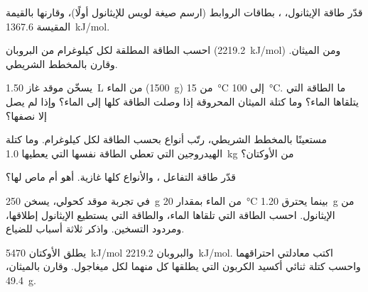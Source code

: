 \begin{exercise}[$\star\star$]\label{exo:g11:reaction-energy:7}
قدّر طاقة  الإيثانول، ، بطاقات الروابط (ارسم صيغة لويس للإيثانول
أولًا)، وقارنها بالقيمة المقيسة \qty{1367.6}{kJ/mol}.
\end{exercise}

\begin{exercise}[$\star\star$]\label{exo:g11:reaction-energy:8}
احسب الطاقة المطلقة لكل كيلوغرام من البروبان
(\qty{2219.2}{kJ/mol}) ومن الميثان. وقارن بالمخطط الشريطي.
\end{exercise}

\begin{exercise}[$\star\star$]\label{exo:g11:reaction-energy:9}
يسخّن موقد غاز \qty{1.50}{L} من الماء (\qty{1500}{g}) من
\qty{15}{\celsius} إلى \qty{100}{\celsius}. ما الطاقة التي يتلقاها
الماء؟ وما كتلة الميثان المحروقة إذا وصلت الطاقة كلها إلى
الماء؟ وإذا لم يصل إلا نصفها؟
\end{exercise}

\begin{exercise}[$\star\star$]\label{exo:g11:reaction-energy:10}
مستعينًا بالمخطط الشريطي، رتّب أنواع  بحسب الطاقة لكل كيلوغرام. وما كتلة
الهيدروجين التي تعطي الطاقة نفسها التي يعطيها \qty{1.0}{kg} من الأوكتان؟
\end{exercise}

\begin{exercise}[$\star\star$]\label{exo:g11:reaction-energy:11}
قدّر طاقة التفاعل ، والأنواع كلها غازية. أهو  أم
ماص لها؟
\end{exercise}

\begin{exercise}[$\star\star\star$]\label{exo:g11:reaction-energy:12}
في تجربة موقد كحولي، يسخن \qty{250}{g} من الماء بمقدار
\qty{20}{\celsius} بينما يحترق \qty{1.20}{g} من الإيثانول. احسب
الطاقة التي تلقاها الماء، والطاقة التي يستطيع الإيثانول إطلاقها،
ومردود التسخين. واذكر ثلاثة أسباب للضياع.
\end{exercise}

\begin{exercise}[$\star\star\star$]\label{exo:g11:reaction-energy:13}
يطلق الأوكتان \qty{5470}{kJ/mol} والبروبان \qty{2219.2}{kJ/mol}.
اكتب معادلتي احتراقهما واحسب كتلة ثنائي أكسيد الكربون
التي يطلقها كل منهما لكل ميغاجول. وقارن بالميثان، \qty{49.4}{g}.
\end{exercise}

